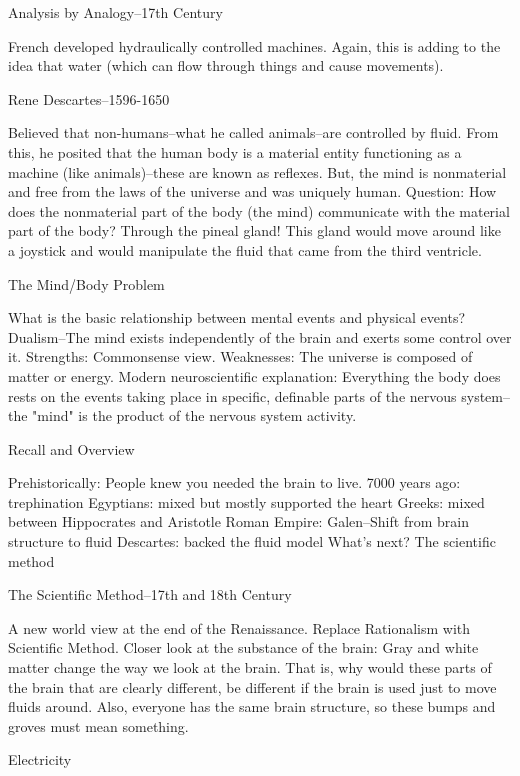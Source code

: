 Analysis by Analogy--17th Century

French developed hydraulically controlled machines.
Again, this is adding to the idea that water (which can flow through things and cause movements).

Rene Descartes--1596-1650

Believed that non-humans--what he called animals--are controlled by fluid.
From this, he posited that the human body is a material entity functioning as a machine (like animals)--these are known as reflexes.
But, the mind is nonmaterial and free from the laws of the universe and was uniquely human.
Question: How does the nonmaterial part of the body (the mind) communicate with the material part of the body? Through the pineal gland! This gland would move around like a joystick and would manipulate the fluid that came from the third ventricle.

The Mind/Body Problem

What is the basic relationship between mental events and physical events?
Dualism--The mind exists independently of the brain and exerts some control over it.
	Strengths: Commonsense view.
	Weaknesses: The universe is composed of matter or energy.
Modern neuroscientific explanation: Everything the body does rests on the events taking place in specific, definable parts of the nervous system--the "mind" is the product of the nervous system activity.

Recall and Overview

Prehistorically: People knew you needed the brain to live.
7000 years ago: trephination
Egyptians: mixed but mostly supported the heart
Greeks: mixed between Hippocrates and Aristotle
Roman Empire: Galen--Shift from brain structure to fluid
Descartes: backed the fluid model
What's next? The scientific method

The Scientific Method--17th and 18th Century

A new world view at the end of the Renaissance.
	Replace Rationalism with Scientific Method.
Closer look at the substance of the brain:
    Gray and white matter change the way we look at the brain. That is, why would these parts of the brain that are clearly different, be different if the brain is used just to move fluids around.
    Also, everyone has the same brain structure, so these bumps and groves must mean something.

Electricity

